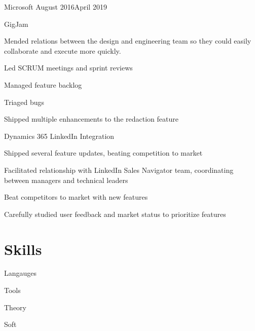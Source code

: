\documentclass[]{resume}
\begin{document}
\begin{employer}{Microsoft} {August 2016}{April 2019}
\begin{team}{GigJam}
  \begin{bullets}
  \item Mended relations between the design
    and engineering team
    so they could easily collaborate
    and execute more quickly.
  \item Led SCRUM meetings and sprint reviews
  \item Managed feature backlog
  \item Triaged bugs
  \item Shipped multiple enhancements to the redaction feature
  \end{bullets}
\end{team}
\begin{team}{Dynamics 365 LinkedIn Integration}
  \begin{bullets}
  \item Shipped several feature updates,
    beating competition to market
  \item Facilitated relationship with LinkedIn Sales Navigator team,
    coordinating between managers
    and technical leaders
  \item Beat competitors to market with new features
  \item Carefully studied user feedback and
    market status to
    prioritize features
  \end{bullets}
\end{team}
\end{employer}

\newcolumn


\section{Skills}

\begin{skilltable}{Langauges}
\end{skilltable}

\begin{skilltable}{Tools}
\end{skilltable}

\begin{skilltable}{Theory}
\end{skilltable}

\begin{skilltable}{Soft}
\end{skilltable}
    
\end{document}
